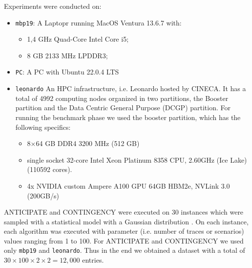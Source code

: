 \documentclass[a4paper,singleside,12pt]{report} %
\begin{document}
Experiments were conducted on:
\begin{itemize}
\item \verb|mbp19|: A Laptopr running MacOS Ventura 13.6.7 with:
    \begin{itemize}
        \item 1,4 GHz Quad-Core Intel Core i5;
        \item 8 GB 2133 MHz LPDDR3;
    \end{itemize}
\item \verb|PC|: A PC with Ubuntu 22.0.4 LTS
\item \verb|leonardo| An HPC infrastructure, i.e. Leonardo hosted by CINECA. It has a total of 4992 computing nodes organized in two partitions, the Booster partition and the Data Centric General Purpose (DCGP) partition. For running the benchmark phase we used the booster partition, which has the following specifics:
    \begin{itemize}
        \item 8×64 GB DDR4 3200 MHz (512 GB)
        \item single socket 32-core Intel Xeon Platinum 8358 CPU, 2.60GHz (Ice Lake) (110592 cores).
        \item 4x NVIDIA custom Ampere A100 GPU 64GB HBM2e, NVLink 3.0 (200GB/s)
    \end{itemize}
\end{itemize}

ANTICIPATE and CONTINGENCY were executed on 30 instances which were sampled with a statistical model with a Gaussian distribution \cite{DEFILIPPO2022109199}.
On each instance, each algorithm was executed with parameter (i.e. number of traces or scenarios) values ranging from 1 to 100. For ANTICIPATE and CONTINGENCY we
used only \verb|mbp19| and \verb|leonardo|. Thus in the end we obtained a dataset with a total of $30 \times 100 \times 2 \times 2 = 12,000$ entries. 
\end{document}
